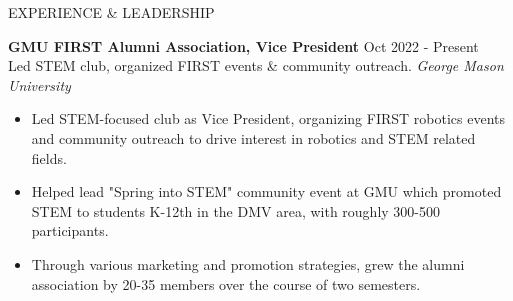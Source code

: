 \documentclass{resume} %
\begin{document}
\begin{rSection}{EXPERIENCE \& LEADERSHIP}

\textbf{GMU FIRST Alumni Association, Vice President} \hfill Oct 2022 - Present\\
Led STEM club, organized FIRST events \& community outreach. \hfill \textit{George Mason University}
 \begin{itemize}
    \itemsep -3pt {} 
     \item Led STEM-focused club as Vice President, organizing FIRST robotics events and community outreach to drive interest in robotics and STEM related fields.
     \item Helped lead "Spring into STEM" community event at GMU which promoted STEM to students K-12th in the DMV area, with roughly 300-500 participants.
    \item Through various marketing and promotion strategies, grew the alumni association by 20-35 members over the course of two semesters.
 \end{itemize}

\end{rSection} 

\end{document}
